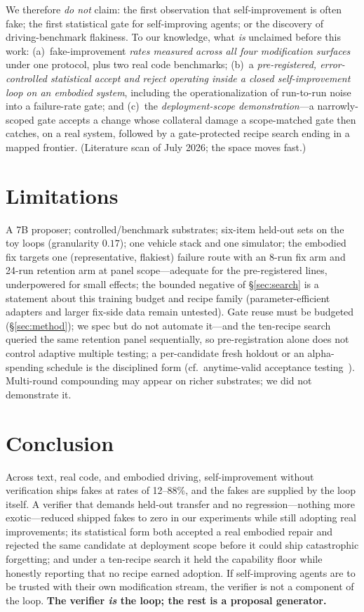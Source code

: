 \documentclass{article}
\begin{document}
We therefore \emph{do not} claim: the first observation that self-improvement is often fake; the first
statistical gate for self-improving agents; or the discovery of driving-benchmark flakiness. To our
knowledge, what \emph{is} unclaimed before this work: (a)~fake-improvement \emph{rates measured across
all four modification surfaces} under one protocol, plus two real code benchmarks; (b)~a
\emph{pre-registered, error-controlled statistical accept and reject operating inside a closed
self-improvement loop on an embodied system}, including the operationalization of run-to-run noise into
a failure-rate gate; and (c)~the \emph{deployment-scope demonstration}---a narrowly-scoped gate accepts
a change whose collateral damage a scope-matched gate then catches, on a real system, followed by a
gate-protected recipe search ending in a mapped frontier. (Literature scan of July 2026; the space moves
fast.)

\section{Limitations}
\label{sec:limits}

A 7B proposer; controlled/benchmark substrates; six-item held-out sets on the toy loops (granularity
$0.17$); one vehicle stack and one simulator; the embodied fix targets one (representative, flakiest)
failure route with an 8-run fix arm and 24-run retention arm at panel scope---adequate for the
pre-registered lines, underpowered for small effects; the bounded negative of \S\ref{sec:search} is a
statement about this training budget and recipe family (parameter-efficient adapters and larger fix-side
data remain untested). Gate reuse must be budgeted (\S\ref{sec:method}); we spec but do not automate
it---and the ten-recipe search queried the same retention panel sequentially, so pre-registration alone
does not control adaptive multiple testing; a per-candidate fresh holdout or an alpha-spending schedule
is the disciplined form (cf.\ anytime-valid acceptance testing~\citep{pace2026}).
Multi-round compounding may appear on richer substrates; we did not demonstrate it.

\section{Conclusion}

Across text, real code, and embodied driving, self-improvement without verification ships fakes at
rates of 12--88\%, and the fakes are supplied by the loop itself. A verifier that demands held-out
transfer and no regression---nothing more exotic---reduced shipped fakes to zero in our experiments
while still adopting real improvements; its statistical form both accepted a real embodied repair and
rejected the same candidate at deployment scope before it could ship catastrophic forgetting; and under
a ten-recipe search it held the capability floor while honestly reporting that no recipe earned
adoption. If self-improving agents are to be trusted with their own modification stream, the verifier
is not a component of the loop. \textbf{The verifier \emph{is} the loop; the rest is a proposal
generator.}
\end{document}
